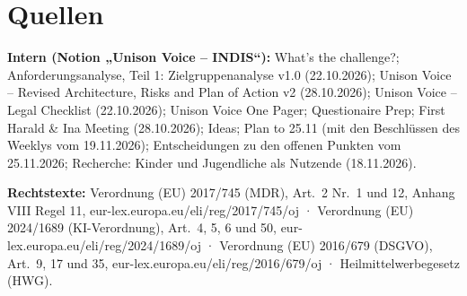 \documentclass[a4paper]{article}
\begin{document}
\section{Quellen}

{\uvsmallfont
\textbf{Intern (Notion „Unison Voice – INDIS“):} What’s the challenge?; Anforderungsanalyse, Teil 1: Zielgruppenanalyse v1.0 (22.10.2026); Unison Voice – Revised Architecture, Risks and Plan of Action v2 (28.10.2026); Unison Voice – Legal Checklist (22.10.2026); Unison Voice One Pager; Questionaire Prep; First Harald \& Ina Meeting (28.10.2026); Ideas; Plan to 25.11 (mit den Beschlüssen des Weeklys vom 19.11.2026); Entscheidungen zu den offenen Punkten vom 25.11.2026; Recherche: Kinder und Jugendliche als Nutzende (18.11.2026).

\textbf{Rechtstexte:} Verordnung (EU) 2017/745 (MDR), Art.~2 Nr.~1 und 12, Anhang VIII Regel 11, eur-lex.europa.eu/eli/reg/2017/745/oj · Verordnung (EU) 2024/1689 (KI-Verordnung), Art.~4, 5, 6 und 50, eur-lex.europa.eu/eli/reg/2024/1689/oj · Verordnung (EU) 2016/679 (DSGVO), Art.~9, 17 und 35, eur-lex.europa.eu/eli/reg/2016/679/oj · Heilmittelwerbegesetz (HWG).\par}
\end{document}
